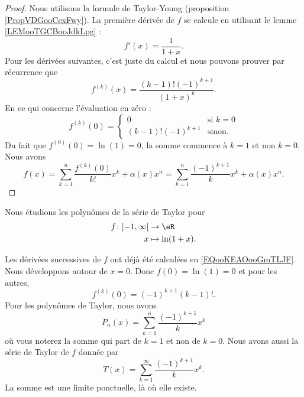 	\begin{proof}
		Nous utilisons la formule de Taylor-Young (proposition \ref{PropVDGooCexFwy}). La première dérivée de \( f\) se calcule en utilisant le lemme \ref{LEMooTGCBooJdkLpg} :
		\begin{equation}
			f'(x)=\frac{1}{ 1+x }.
		\end{equation}
		Pour les dérivées suivantes, c'est juste du calcul et nous pouvons prouver par récurrence que
		\begin{equation}        \label{EQooKEAOooGmTLJF}
			f^{(k)}(x)=\frac{ (k-1)!(-1)^{k+1} }{ (1+x)^k }.
		\end{equation}
		En ce qui concerne l'évaluation en zéro :
		\begin{equation}
			f^{(k)}(0)=\begin{cases}
				0                & \text{si } k=0 \\
				(k-1)!(-1)^{k+1} & \text{sinon.}
			\end{cases}
		\end{equation}
		Du fait que \( f^{(0)}(0)=\ln(1)=0\), la somme commence à \( k=1\) et non \( k=0\). Nous avons
		\begin{equation}
			f(x)=\sum_{k=1}^{n}\frac{ f^{(k)}(0) }{ k! }x^k+\alpha(x)x^n=\sum_{k=1}^n\frac{ (-1)^{k+1} }{ k }x^k+\alpha(x)x^n.
		\end{equation}
	\end{proof}

	Nous étudions les polynômes de la série de Taylor pour
	\begin{equation}
		\begin{aligned}
			f\colon \mathopen] -1 , \infty \mathclose[ & \to \eR           \\
			x                                          & \mapsto \ln(1+x).
		\end{aligned}
	\end{equation}

	Les dérivées successives de \( f\) ont déjà été calculées en \eqref{EQooKEAOooGmTLJF}. Nous développons autour de \( x=0\). Donc \( f(0)=\ln(1)=0\) et pour les autres,
	\begin{equation}
		f^{(k)}(0)=(-1)^{k+1}(k-1)!.
	\end{equation}
	Pour les polynômes de Taylor, nous avons
	\begin{equation}
		P_n(x)=\sum_{k=1}^n\frac{ (-1)^{k+1} }{ k }x^k
	\end{equation}
	où vous noterez la somme qui part de \( k=1\) et non de \( k=0\). Nous avons aussi la série de Taylor de \( f\) donnée par
	\begin{equation}        \label{EQooTAREooKfpTPo}
		T(x)=\sum_{k=1}^{\infty}\frac{ (-1)^{k+1} }{ k }x^k.
	\end{equation}
	La somme est une limite ponctuelle, là où elle existe.

